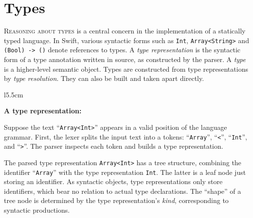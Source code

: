 \documentclass[../generics]{subfiles}
\begin{document}
\chapter{Types}\label{types}

\lettrine{R}{easoning about types} is a central concern in the implementation of a statically typed language. In Swift, various syntactic forms such as \texttt{Int}, \texttt{Array<String>} and \texttt{(Bool) -> ()} denote references to types. A \emph{type representation} is the syntactic form of a type annotation written in source, as constructed by the parser. A \emph{type} is a higher-level semantic object. Types are constructed from type representations by \emph{type resolution}. They can also be built and taken apart directly.

\medskip

\begin{wrapfigure}[13]{l}{5.5cm}
\begin{center}
\textbf{A type representation:}
\end{center}
\end{wrapfigure}

Suppose the text ``\texttt{Array<Int>}'' appears in a valid position of the language grammar. First, the lexer splits the input text into a tokens: ``\texttt{Array}'', ``\texttt{<}'', ``\texttt{Int}'', and ``\texttt{>}''. The parser inspects each token and builds a type representation.

The parsed type representation \texttt{Array<Int>} has a tree structure, combining the identifier ``\texttt{Array}'' with the type representation \texttt{Int}. The latter is a leaf node just storing an identifier. As syntactic objects, type representations only store identifiers, which bear no relation to actual type declarations. The ``shape'' of a tree node is determined by the type representation's \emph{kind}, corresponding to syntactic productions.
\end{document}
